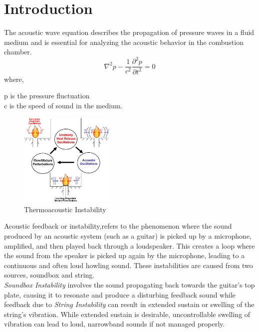 \documentclass[8pt]{article} %
\begin{document}
\section{Introduction}

The acoustic wave equation describes the propagation of pressure waves in a fluid medium and is essential for analyzing the acoustic behavior in the combustion chamber. \\ 
\begin{equation}
∇^{2} p - \frac{1}{c^{2}} \frac{\partial^2 p}{\partial t^2} = 0
\end{equation}
where,
\begin{center}
p is the pressure fluctuation\\
c is the speed of sound in the medium.\\
\end{center}
\begin{figure}
  \begin{center}
    \includegraphics[width=0.4\textwidth]{./ti.jpg}
  \end{center}
  \caption{Thermoacoustic Instability}
 \label{fig:Thermoacoustic Instability}
\end{figure} 
Acoustic feedback or instability,refers to the phenomenon where the sound produced by an acoustic system (such as a guitar) is picked up by a microphone, amplified, and then played back through a loudspeaker. This creates a loop where the sound from the speaker is picked up again by the microphone, leading to a continuous and often loud howling sound. These  instabilities are caused from two sources, soundbox and string.\cite{Acoustic Instability}\\

\textit{Soundbox Instability} involves the sound propagating back towards the guitar's top plate, causing it to resonate and produce a disturbing feedback sound while feedback due to \textit{String Instability} can result in extended sustain or swelling of the string's vibration. While extended sustain is desirable, uncontrollable swelling of vibration can lead to loud, narrowband sounds if not managed properly. \\
\end{document}
